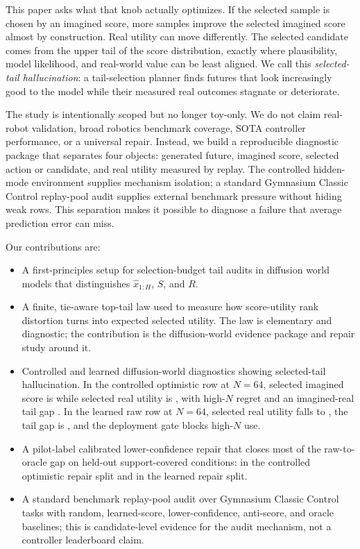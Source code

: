 \documentclass{article}
\newcommand{\future}{\hat{x}_{1:H}}
\newcommand{\score}{S}
\newcommand{\utility}{R}
\begin{document}
This paper asks what that knob actually optimizes. If the selected sample is chosen by an imagined score, more samples improve the selected imagined score almost by construction. Real utility can move differently. The selected candidate comes from the upper tail of the score distribution, exactly where plausibility, model likelihood, and real-world value can be least aligned. We call this \emph{selected-tail hallucination}: a tail-selection planner finds futures that look increasingly good to the model while their measured real outcomes stagnate or deteriorate.

The study is intentionally scoped but no longer toy-only. We do not claim real-robot validation, broad robotics benchmark coverage, SOTA controller performance, or a universal repair. Instead, we build a reproducible diagnostic package that separates four objects: generated future, imagined score, selected action or candidate, and real utility measured by replay. The controlled hidden-mode environment supplies mechanism isolation; a standard Gymnasium Classic Control replay-pool audit supplies external benchmark pressure without hiding weak rows. This separation makes it possible to diagnose a failure that average prediction error can miss.

Our contributions are:
\begin{itemize}
  \item A first-principles setup for selection-budget tail audits in diffusion world models that distinguishes $\future$, $\score$, and $\utility$.
  \item A finite, tie-aware top-tail law used to measure how score-utility rank distortion turns into expected selected utility. The law is elementary and diagnostic; the contribution is the diffusion-world evidence package and repair study around it.
  \item Controlled and learned diffusion-world diagnostics showing selected-tail hallucination. In the controlled optimistic row at $N=64$, selected imagined score is \VFourDWMOptimisticImagined{} while selected real utility is \VFourDWMOptimisticReal{}, with high-$N$ regret \VFourDWMOptimisticRegret{} and an imagined-real tail gap \VFourDWMOptimisticTailGap{}. In the learned raw row at $N=64$, selected real utility falls to \VFourDWMLearnedRawReal{}, the tail gap is \VFourDWMLearnedRawTailGap{}, and the deployment gate blocks high-$N$ use.
  \item A pilot-label calibrated lower-confidence repair that closes most of the raw-to-oracle gap on held-out support-covered conditions: \VFourDWMControlledGapBThirtyTwo{} in the controlled optimistic repair split and \VFourDWMLearnedGapBThirtyTwo{} in the learned repair split.
  \item A standard benchmark replay-pool audit over Gymnasium Classic Control tasks with random, learned-score, lower-confidence, anti-score, and oracle baselines; this is candidate-level evidence for the audit mechanism, not a controller leaderboard claim.
\end{itemize}
\end{document}
